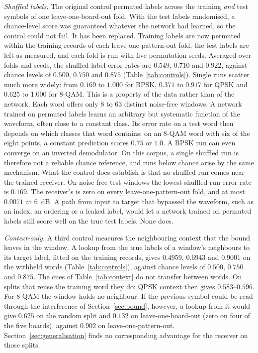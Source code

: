 \documentclass{ieeeaccess}
\begin{document}
\emph{Shuffled labels.} The original control permuted labels across the
training \emph{and} test symbols of one leave-one-board-out fold. With the test
labels randomised, a chance-level score was guaranteed whatever the network
had learned, so the control could not fail. It has been replaced. Training
labels are now permuted within the training records of each
leave-one-pattern-out fold, the test labels are left as measured, and each fold
is run with five permutation seeds. Averaged over folds and seeds, the shuffled-label error rates are $0.549$, $0.710$ and $0.922$, against chance levels of $0.500$, $0.750$ and $0.875$ (Table~\ref{tab:controls}). Single runs scatter much more widely: from $0.169$ to $1.000$ for BPSK, $0.371$ to $0.917$ for QPSK and $0.625$ to $1.000$ for 8-QAM.
This is a property of the data rather than of the network. Each word offers only $8$ to $63$ distinct noise-free windows. A network trained on permuted labels learns an arbitrary but systematic function of the waveform, often close to a constant class. Its error rate on a test word then depends on which classes that word contains: on an 8-QAM word with six of the eight points, a constant prediction scores $0.75$ or $1.0$. A BPSK run can even converge on an inverted demodulator. On this corpus, a single shuffled run is therefore not a reliable chance reference, and runs below chance arise by the same mechanism.
What the control does establish is that no shuffled run comes near the trained receiver. On noise-free test windows the lowest shuffled-run error rate is $0.169$. The receiver's is zero on every leave-one-pattern-out fold, and at most $0.0071$ at $6$~dB. A path from input to target that bypassed the waveform, such as an index, an ordering or a leaked label, would let a network trained on permuted labels still score well on the true test labels. None does.

\emph{Context-only.} A third control measures the neighbouring context
that the bound leaves in the window. A lookup from the true labels of a
window's neighbours to its target label, fitted on the training records, gives
$0.4959$, $0.6943$ and $0.9001$ on the withheld words (Table~\ref{tab:controls}), against chance levels of $0.500$, $0.750$ and $0.875$. The cues of Table~\ref{tab:context} do not transfer between words. On splits that reuse the training word they do: QPSK context then gives $0.583$--$0.596$. For 8-QAM the window holds no neighbour. If the previous symbol could be read through the interference of Section~\ref{sec:bound}, however, a lookup from it would give $0.625$ on the random split and $0.132$ on leave-one-board-out (zero on four of the five boards), against $0.902$ on leave-one-pattern-out. Section~\ref{sec:generalisation} finds no corresponding advantage for the receiver on those splits.
\end{document}
